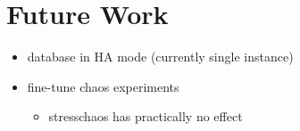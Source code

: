 \chapter{Future Work} \label{future-work}

\begin{itemize}
	\item database in HA mode (currently single instance)
	\item fine-tune chaos experiments
	\begin{itemize}
		\item stresschaos has practically no effect
	\end{itemize}
\end{itemize}